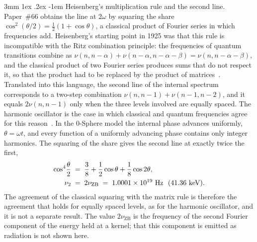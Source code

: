 \documentclass[%
 reprint, amsmath,amssymb, aps, prb, ]{revtex4-2}
\makeatletter
\numberwithin{equation}{section}
\renewcommand\paragraph{%
  \@startsection{paragraph}{4}{\z@}%
    {3mm \@plus 1ex \@minus .2ex}%
    {-1em}%
    {\normalfont\normalsize\itshape}}
\newcommand{\iphase}{\theta}  %
\makeatother
\begin{document}
\paragraph{Heisenberg's multiplication rule and the second line.} Paper~\#66 obtains the line at $2\omega$ by squaring the share $\cos^2(\iphase/2) = \tfrac12(1 + \cos\iphase)$, a classical product of Fourier series in which frequencies add. Heisenberg's starting point in 1925 was that this rule is incompatible with the Ritz combination principle: the frequencies of quantum transitions combine as $\nu(n, n-\alpha) + \nu(n-\alpha, n-\alpha-\beta) = \nu(n, n-\alpha-\beta)$, and the classical product of two Fourier series produces sums that do not respect it, so that the product had to be replaced by the product of matrices~\cite{Heisenberg1925, Yukawa1954}. Translated into this language, the second line of the internal spectrum corresponds to a two-step combination $\nu(n, n-1) + \nu(n-1, n-2)$, and it equals $2\nu(n, n-1)$ only when the three levels involved are equally spaced. The harmonic oscillator is the case in which classical and quantum frequencies agree for this reason~\cite{Yukawa1954}. In the 0-Sphere model the internal phase advances uniformly, $\iphase = \omega t$, and every function of a uniformly advancing phase contains only integer harmonics. The squaring of the share gives the second line at exactly twice the first,
\begin{align}
\cos^4\!\frac{\iphase}{2} &\;=\; \frac38 + \frac12\cos\iphase + \frac18\cos2\iphase,
\notag\\
\nu_2 &\;=\; 2\nu_{\mathrm{ZB}} \;=\; 1.0001\times10^{19}\ \text{Hz}\ \ (41.36\ \text{keV}).
\label{eq:second_line}
\end{align}
The agreement of the classical squaring with the matrix rule is therefore the agreement that holds for equally spaced levels, as for the harmonic oscillator, and it is not a separate result. The value $2\nu_{\mathrm{ZB}}$ is the frequency of the second Fourier component of the energy held at a kernel; that this component is emitted as radiation is not shown here.
\end{document}
